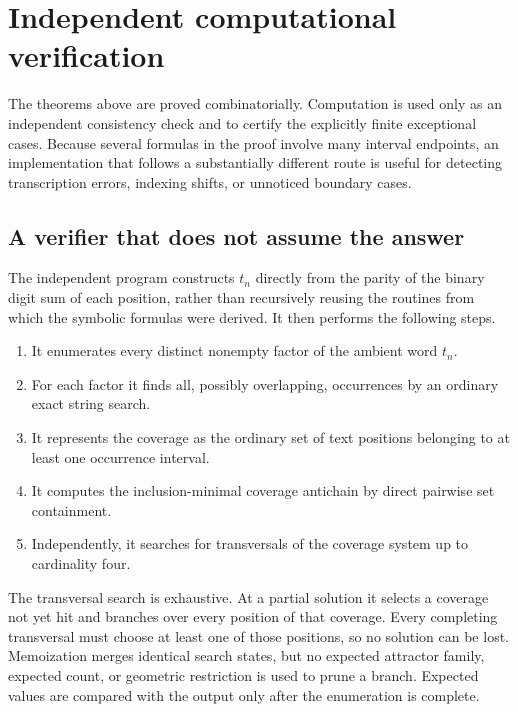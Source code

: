 \documentclass[11pt,a4paper]{article}
\theoremstyle{definition}\newtheorem{definition}[theorem]{Definition}
\theoremstyle{remark}\newtheorem{remark}[theorem]{Remark}
\begin{document}
\section{Independent computational verification}
\label{sec:computational-verification}

The theorems above are proved combinatorially.  Computation is used only as an independent consistency check and to certify the explicitly finite exceptional cases.  Because several formulas in the proof involve many interval endpoints, an implementation that follows a substantially different route is useful for detecting transcription errors, indexing shifts, or unnoticed boundary cases.

\subsection{A verifier that does not assume the answer}
\label{subsec:independent-verifier}

The independent program constructs $t_n$ directly from the parity of the binary digit sum of each position, rather than recursively reusing the routines from which the symbolic formulas were derived.  It then performs the following steps.

\begin{enumerate}[label=\arabic*.]
\item It enumerates every distinct nonempty factor of the ambient word $t_n$.
\item For each factor it finds all, possibly overlapping, occurrences by an ordinary exact string search.
\item It represents the coverage as the ordinary set of text positions belonging to at least one occurrence interval.
\item It computes the inclusion-minimal coverage antichain by direct pairwise set containment.
\item Independently, it searches for transversals of the coverage system up to cardinality four.
\end{enumerate}

The transversal search is exhaustive.  At a partial solution it selects a coverage not yet hit and branches over every position of that coverage.  Every completing transversal must choose at least one of those positions, so no solution can be lost.  Memoization merges identical search states, but no expected attractor family, expected count, or geometric restriction is used to prune a branch.  Expected values are compared with the output only after the enumeration is complete.
\end{document}
